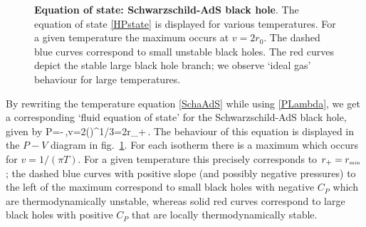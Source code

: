 \begin{figure}
\begin{center}
\caption{{\bf Equation of state: Schwarzschild-AdS black hole}. The equation of state \eqref{HPstate} is displayed for various temperatures. 
For a given temperature the maximum occurs at $v=2r_0$. The dashed blue curves correspond to small unstable black holes. The red curves depict the stable large black hole branch; we observe   `ideal gas' behaviour for large temperatures. 
}
\label{Fig:PVSchwAdS}
\end{center}
\end{figure}
By rewriting the temperature equation \eqref{SchaAdS} while using \eqref{PLambda}, we get a corresponding `fluid equation of state' 
for the Schwarzschild-AdS black hole, given by 
\be\label{HPstate}
P=-\,,\quad v=2\Bigl(\Bigr)^{1/3}=2r_+\,.
\ee     
 The behaviour of this equation is displayed in the $P-V$ diagram in fig.~\ref{Fig:PVSchwAdS}. For each isotherm there is a maximum which occurs for $v=1/(\pi T)$. For a given temperature this precisely corresponds to $r_+=r_{\mbox{\tiny  \tiny min}}$; 
the dashed blue curves with positive slope (and possibly negative pressures) to the left of the maximum correspond to small black holes with negative $C_P$ which are thermodynamically unstable, whereas solid red curves correspond to large black holes with positive $C_P$ that are locally thermodynamically stable.



